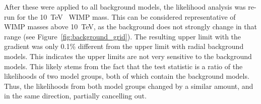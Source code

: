 After these were applied to all background models, the likelihood analysis was re-run for the \SI{10}{\TeV{}} WIMP mass.
This can be considered representative of WIMP masses above \SI{10}{\TeV}, as the background does not strongly change in that range (see Figure~\ref{fig:background_grid}).
The resulting upper limit with the gradient was only 0.1\% different from the upper limit with radial background models.
This indicates the upper limits are not very sensitive to the background models.
%
%
This likely stems from the fact that the test statistic is a ratio of the likelihoods of two model groups, both of which contain the background models.
Thus, the likelihoods from both model groups changed by a similar amount, and in the same direction, partially cancelling out.



